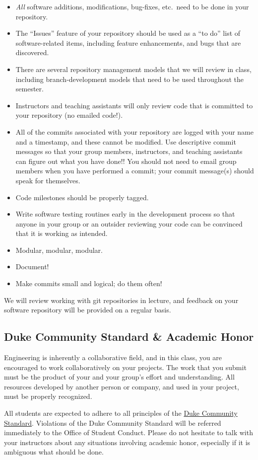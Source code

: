 \begin{itemize}
    \item \emph{All} software additions, modifications, bug-fixes, etc.\ need
        to be done in your repository.
    \item The ``Issues'' feature of your repository should be used as a ``to
        do'' list of software-related items, including feature enhancements,
        and bugs that are discovered.
    \item There are several repository management models that we will review in class,
        including branch-development models that need to be used throughout the semester.
    \item Instructors and teaching assistants will only review code that is
    committed to your repository (no emailed code!).
    \item All of the commits associated with your repository are logged with
    your name and a timestamp, and these cannot be modified.  Use descriptive
    commit messages so that your group members, instructors, and teaching
    assistants can figure out what you have done!!  You should not need to email
    group members when you have performed a commit; your commit message(s)
    should speak for themselves.
    \item Code milestones should be properly tagged.
    \item Write software testing routines early in the development process so
        that anyone in your group or an outsider reviewing your code can be
        convinced that it is working as intended.
    \item Modular, modular, modular.
    \item Document!
    \item Make commits small and logical; do them often!
\end{itemize}

We will review working with git repositories in lecture, and feedback
on your software repository will be provided on a regular basis.

\subsection*{Duke Community Standard \& Academic Honor} Engineering is
inherently a collaborative field, and in this class, you are encouraged to work
collaboratively on your projects.  The work that you submit must be the product
of your and your group's effort and understanding.  All resources developed by
another person or company, and used in your project, must be properly
recognized.

All students are expected to adhere to all principles of the
\href{http://www.integrity.duke.edu/standard.html}{Duke Community Standard}.
Violations of the Duke Community Standard will be referred immediately to the
Office of Student Conduct.  Please do not hesitate to talk with your instructors
about any situations involving academic honor, especially if it is ambiguous
what should be done.


